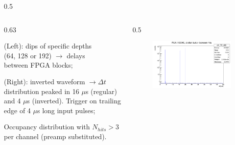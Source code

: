\documentclass{beamer}
\begin{document}
\begin{frame}
\begin{columns}
\begin{column}{0.5\framewidth}
\begin{figure}[!h]
     \label{fig:normalhits}
\end{figure}
\end{column}
\end{columns}
\vspace{-1.5mm}
    \begin{columns}
    \begin{column}{0.63\framewidth}
        \setlength{\leftmargini}{1.1em}
      \begin{itemize}
 {\small
 \item (Left): dips of specific depths 
 \\ (64, 128 or 192) $\rightarrow$ delays 
 \\ between FPGA blocks;
\item (Right): inverted waveform $\rightarrow \Delta t $ distribution peaked in 16 $\mu$s (regular) and 4 $\mu$s (inverted). Trigger on trailing edge of 4 $\mu$s long input pulses;
\item Occupancy distribution with $N_{hits}> 3$ per channel (preamp substituted).}

\end{itemize}
\end{column}
\begin{column}{0.5\framewidth}
         \begin{figure}[!h]
      \centering
      \hspace*{-2em}
      \includegraphics[width=\columnwidth]{figures/png/deltathits.png}
     \label{fig:normalhits}
\end{figure}
\end{column}
\end{columns}
\end{frame}
\end{document}
